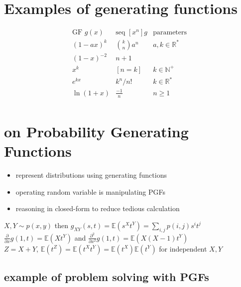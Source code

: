 \documentclass{article}
\newcommand{\E}{\mathbb{E}}
\begin{document}
\section{Examples of generating functions}

\[
	\begin{array}{l|l|l}
		\text{GF }g(x) & \text{seq }[x^n]g & \text{parameters}       \\
		\hline
		(1-ax)^k       & \binom{k}{n}a^n   & a,k\in\mathbb{R}^{\ast} \\
		(1-x)^{-2}     & n+1               &                         \\
		x^k            & [n=k]             & k\in\mathbb{N}^{+}      \\
		e^{kx}         & k^n/n!            & k\in\mathbb{R}^{\ast}   \\
		\ln(1+x)       & \frac{-1}{n}      & n\geq 1                 \\
	\end{array}
\]

\section{on Probability Generating Functions}

\begin{itemize}
	\item represent distributions using generating functions
	\item operating random variable is manipulating PGFs
	\item reasoning in closed-form to reduce tedious calculation
\end{itemize}

\(X,Y \sim p(x,y)\) then \(g_{XY}(s,t) = \E(s^X t^Y) = \sum_{i,j} p(i,j) s^i t^j\)\\
\(\frac{\partial}{\partial x} g(1,t) = \E(X t^Y)\) and \(\frac{\partial^2}{\partial x^2} g(1,t) = \E(X(X-1) t^Y)\)\\
\(Z=X+Y\), \(\mathbb{E}(t^Z) = \mathbb{E}(t^X t^Y) = \mathbb{E}(t^X) \mathbb{E}(t^Y)\) for independent $X,Y$\\


\subsection{example of problem solving with PGFs}
\end{document}
